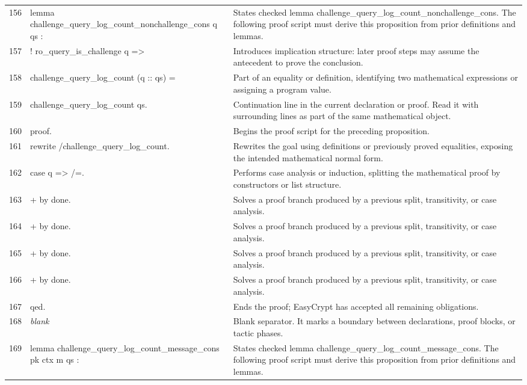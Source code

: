 \documentclass[10pt]{article}
\begin{document}
\begin{longtable}{r L{0.53\textwidth} L{0.37\textwidth}}
156 & {\ttfamily\scriptsize lemma challenge\_query\_log\_count\_nonchallenge\_cons q qs :} & States checked lemma challenge\_query\_log\_count\_nonchallenge\_cons.  The following proof script must derive this proposition from prior definitions and lemmas. \\
157 & {\ttfamily\scriptsize   ! ro\_query\_is\_challenge q =>} & Introduces implication structure: later proof steps may assume the antecedent to prove the conclusion. \\
158 & {\ttfamily\scriptsize   challenge\_query\_log\_count (q :: qs) =} & Part of an equality or definition, identifying two mathematical expressions or assigning a program value. \\
159 & {\ttfamily\scriptsize   challenge\_query\_log\_count qs.} & Continuation line in the current declaration or proof.  Read it with surrounding lines as part of the same mathematical object. \\
160 & {\ttfamily\scriptsize proof.} & Begins the proof script for the preceding proposition. \\
161 & {\ttfamily\scriptsize rewrite /challenge\_query\_log\_count.} & Rewrites the goal using definitions or previously proved equalities, exposing the intended mathematical normal form. \\
162 & {\ttfamily\scriptsize case q => /=.} & Performs case analysis or induction, splitting the mathematical proof by constructors or list structure. \\
163 & {\ttfamily\scriptsize + by done.} & Solves a proof branch produced by a previous split, transitivity, or case analysis. \\
164 & {\ttfamily\scriptsize + by done.} & Solves a proof branch produced by a previous split, transitivity, or case analysis. \\
165 & {\ttfamily\scriptsize + by done.} & Solves a proof branch produced by a previous split, transitivity, or case analysis. \\
166 & {\ttfamily\scriptsize + by done.} & Solves a proof branch produced by a previous split, transitivity, or case analysis. \\
167 & {\ttfamily\scriptsize qed.} & Ends the proof; EasyCrypt has accepted all remaining obligations. \\
168 & {\ttfamily\scriptsize \emph{blank}} & Blank separator.  It marks a boundary between declarations, proof blocks, or tactic phases. \\
169 & {\ttfamily\scriptsize lemma challenge\_query\_log\_count\_message\_cons pk ctx m qs :} & States checked lemma challenge\_query\_log\_count\_message\_cons.  The following proof script must derive this proposition from prior definitions and lemmas. \\

\end{longtable}
\end{document}
